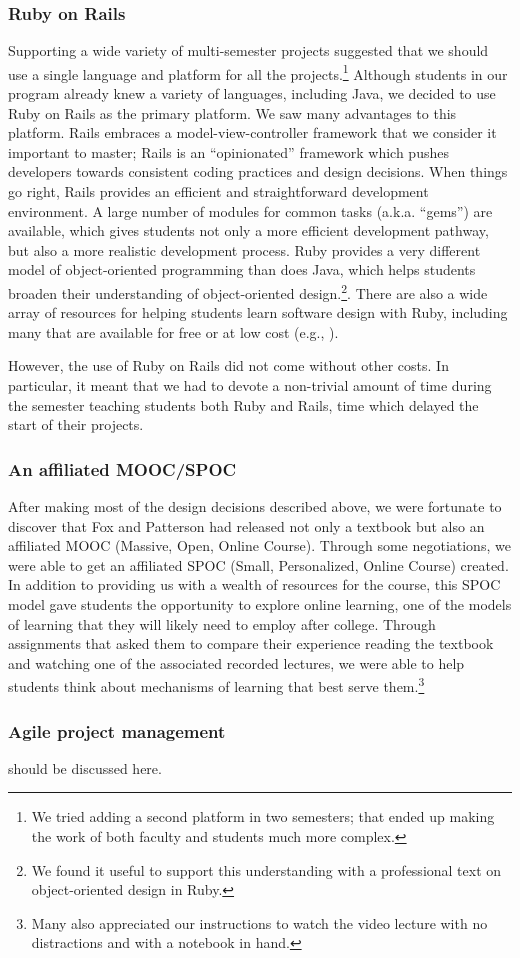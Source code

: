 
\subsubsection{Ruby on Rails}

Supporting a wide variety of multi-semester projects suggested that
we should use a single language and platform for all the
projects.\footnote{We tried adding a second platform in two
semesters; that ended up making the work of both faculty and students
much more complex.}  Although students in our program already knew
a variety of languages, including Java, we decided to use Ruby on
Rails as the primary platform.  We saw many advantages to this
platform. Rails embraces a model-view-controller framework that we
consider it important to master; Rails is an ``opinionated'' framework
which pushes developers towards consistent coding practices and
design decisions.  When things go right, Rails provides an efficient
and straightforward development environment.  A large number of
modules for common tasks (a.k.a. ``gems'') are available, which
gives students not only a more efficient development pathway, but
also a more realistic development process. Ruby provides a very
different model of object-oriented programming than does Java, which
helps students broaden their understanding of object-oriented
design.\footnote{We found it useful to support this understanding
with a professional text on object-oriented design in Ruby.\cite{poodr}}.
There are also a wide array of resources for helping students
learn software design with Ruby, including many that are available
for free or at low cost (e.g., \cite{saasbook,rails-tutorial}).

However, the use of Ruby on Rails did not come without other costs.  In
particular, it meant that we had to devote a non-trivial amount of
time during the semester teaching students both Ruby and Rails, time
which delayed the start of their projects.

\subsubsection{An affiliated MOOC/SPOC}

After making most of the design decisions described above, we were
fortunate to discover that Fox and Patterson had released not only
a textbook \cite{saasbook} but also an affiliated MOOC (Massive,
Open, Online Course).  Through some negotiations, we were able to
get an affiliated SPOC (Small, Personalized, Online Course) created.
In addition to providing us with a wealth of resources for the
course, this SPOC model gave students the opportunity to explore
online learning, one of the models of learning that they will likely
need to employ after college.  Through assignments that asked them
to compare their experience reading the textbook and watching one
of the associated recorded lectures, we were able to help students
think about mechanisms of learning that best serve them.\footnote{Many
also appreciated our instructions to watch the video lecture with
no distractions and with a notebook in hand.}

\subsubsection{Agile project management}

should be discussed here.


